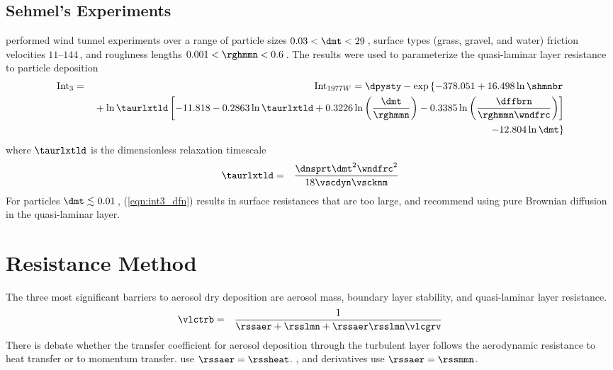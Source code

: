 \documentclass[12pt,twoside]{book}
\begin{document}
\subsection[Sehmel's Experiments]{Sehmel's Experiments}\label{sxn:SeH78}
\cite{SeH78,SeH782} performed wind tunnel experiments over a
range of particle sizes $0.03 < \dmt < 29$\,\um, surface types (grass,
gravel, and water) friction velocities $11$--$144$\,\cmxs, and
roughness lengths $0.001 < \rghmmn < 0.6$\,\cm.
The results were used to parameterize the quasi-laminar layer
resistance to particle deposition
\begin{eqnarray}
\label{eqn:int3_dfn}
\mbox{Int}_{3} & = & \mbox{Int}_{1977W} = 
\dpysty - \exp \left\{ 
-378.051 + 16.498 \ln \shmnbr 
\right.
\nonumber \\
& & 
{} + \ln \taurlxtld \left[
-11.818 - 0.2863 \ln \taurlxtld + 0.3226 
\ln \left( \frac{\dmt}{\rghmmn } \right)
- 0.3385 \ln \left( \frac{\dffbrn}{\rghmmn \wndfrc } \right) \right] 
\nonumber \\
& & 
{} \left. -12.804 \ln \dmt \displaystyle \right\}
\end{eqnarray}
where $\taurlxtld$ is the dimensionless relaxation timescale
\begin{eqnarray}
\taurlxtld & = & \frac{\dnsprt \dmt^{2} \wndfrc^{2}}{18 \vscdyn \vscknm }
\label{eqn:tau_rlx_tld_dfn}
\end{eqnarray}
For particles $\dmt \lesssim 0.01$\,\um, (\ref{eqn:int3_dfn}) results
in surface resistances that are too large, and \cite{SeH78} recommend 
using pure Brownian diffusion in the quasi-laminar layer.

\section[Resistance Method]{Resistance Method}\label{sxn:rss}
The three most significant barriers to aerosol dry deposition are
aerosol mass, boundary layer stability, and quasi-laminar layer
resistance.
\begin{eqnarray}
\vlctrb & = & \frac{1}{\rssaer + \rsslmn + \rssaer \rsslmn \vlcgrv }
\label{eqn:vlc_trb_dfn}
\end{eqnarray}
There is debate whether the transfer coefficient for aerosol
deposition through the turbulent layer follows the aerodynamic
resistance to heat transfer or to momentum transfer.
\cite{Wil82} use $\rssaer = \rssheat$.
\cite{SeH78}, \cite{SlS80} and derivatives use $\rssaer = \rssmmn$.
\end{document}
